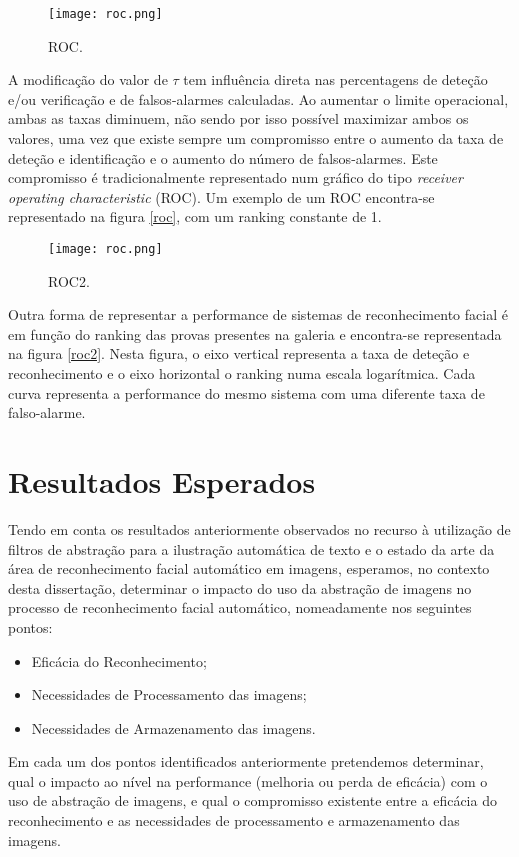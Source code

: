 \begin{figure}[ht]
  \begin{center}
    \leavevmode
    \texttt{[image: roc.png]}
    \caption{ROC.}	
    \label{fig:roc}
  \end{center}
\end{figure}
A modificação do valor de $\tau$ tem influência direta nas percentagens de deteção e/ou verificação e de falsos-alarmes calculadas. Ao aumentar o limite operacional, ambas as taxas diminuem, não sendo por isso possível maximizar ambos os valores, uma vez que existe sempre um compromisso entre o aumento da taxa de deteção e identificação e o aumento do número de falsos-alarmes. Este compromisso é tradicionalmente representado num gráfico do tipo \textit{receiver operating characteristic} (ROC). Um exemplo de um ROC encontra-se representado na figura \ref{roc}, com um ranking constante de 1. 

\begin{figure}[ht]
  \begin{center}
    \leavevmode
    \texttt{[image: roc.png]}
    \caption{ROC2.}	
    \label{fig:roc2}
  \end{center}
\end{figure}
Outra forma de representar a performance de sistemas de reconhecimento facial é em função do ranking das provas presentes na galeria e encontra-se representada na figura \ref{roc2}. Nesta figura, o eixo vertical representa a taxa de deteção e reconhecimento e o eixo horizontal o ranking numa escala logarítmica. Cada curva representa a performance do mesmo sistema com uma diferente taxa de falso-alarme.

\section{Resultados Esperados}
Tendo em conta os resultados anteriormente observados no recurso à utilização de filtros de abstração para a ilustração automática de texto e o estado da arte da área de reconhecimento facial automático em imagens, esperamos, no contexto desta dissertação, determinar o impacto do uso da abstração de imagens no processo de reconhecimento facial automático, nomeadamente nos seguintes pontos:
\begin{itemize}
\item Eficácia do Reconhecimento;
\item Necessidades de Processamento das imagens;
\item Necessidades de Armazenamento das imagens.
\end{itemize}
Em cada um dos pontos identificados anteriormente pretendemos determinar, qual o impacto ao nível na performance (melhoria ou perda de eficácia) com o uso de abstração de imagens, e qual o compromisso existente entre a eficácia do reconhecimento e as necessidades de processamento e armazenamento das imagens.

